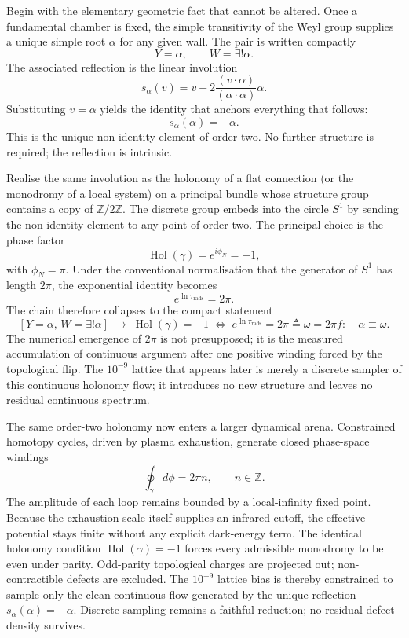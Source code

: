 Begin with the elementary geometric fact that cannot be altered. Once a fundamental chamber is fixed, the simple transitivity of the Weyl group supplies a unique simple root \(\alpha\) for any given wall. The pair is written compactly
\[
Y=\alpha,\qquad W=\exists!\alpha.
\]
The associated reflection is the linear involution
\[
s_\alpha(v)=v-2\frac{(v\cdot\alpha)}{(\alpha\cdot\alpha)}\alpha.
\]
Substituting \(v=\alpha\) yields the identity that anchors everything that follows:
\[
s_\alpha(\alpha)=-\alpha.
\]
This is the unique non-identity element of order two. No further structure is required; the reflection is intrinsic.

Realise the same involution as the holonomy of a flat connection (or the monodromy of a local system) on a principal bundle whose structure group contains a copy of \(\mathbb{Z}/2\mathbb{Z}\). The discrete group embeds into the circle \(S^1\) by sending the non-identity element to any point of order two. The principal choice is the phase factor
\[
\operatorname{Hol}(\gamma)=e^{i\phi_N}=-1,
\]
with \(\phi_N=\pi\). Under the conventional normalisation that the generator of \(S^1\) has length \(2\pi\), the exponential identity becomes
\[
e^{\ln\tau_{\mathrm{rads}}}=2\pi.
\]
The chain therefore collapses to the compact statement
\[
[Y=\alpha,\,W=\exists!\alpha]\;\longrightarrow\;\operatorname{Hol}(\gamma)=-1\;\Longleftrightarrow\;e^{\ln\tau_{\mathrm{rads}}}=2\pi\triangleq\omega=2\pi f:\quad\alpha\equiv\omega.
\]
The numerical emergence of \(2\pi\) is not presupposed; it is the measured accumulation of continuous argument after one positive winding forced by the topological flip. The \(10^{-9}\) lattice that appears later is merely a discrete sampler of this continuous holonomy flow; it introduces no new structure and leaves no residual continuous spectrum.

The same order-two holonomy now enters a larger dynamical arena. Constrained homotopy cycles, driven by plasma exhaustion, generate closed phase-space windings
\[
\oint_\gamma d\phi=2\pi n,\qquad n\in\mathbb{Z}.
\]
The amplitude of each loop remains bounded by a local-infinity fixed point. Because the exhaustion scale itself supplies an infrared cutoff, the effective potential stays finite without any explicit dark-energy term. The identical holonomy condition \(\operatorname{Hol}(\gamma)=-1\) forces every admissible monodromy to be even under parity. Odd-parity topological charges are projected out; non-contractible defects are excluded. The \(10^{-9}\) lattice bias is thereby constrained to sample only the clean continuous flow generated by the unique reflection \(s_\alpha(\alpha)=-\alpha\). Discrete sampling remains a faithful reduction; no residual defect density survives.

